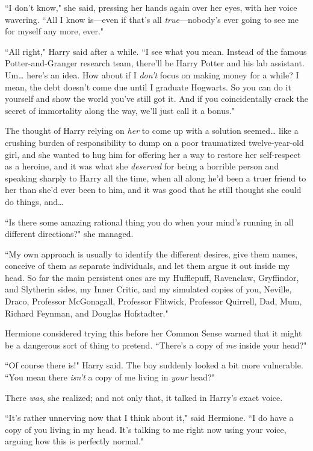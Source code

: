 ``I don't know," she said, pressing her hands again over her eyes, with her voice wavering. ``All I know is—even if that's all \emph{true}—nobody's ever going to see me for myself any more, ever."

``All right," Harry said after a while. ``I see what you mean. Instead of the famous Potter-and-Granger research team, there'll be Harry Potter and his lab assistant. Um{\ldots} here's an idea. How about if I \emph{don't} focus on making money for a while? I mean, the debt doesn't come due until I graduate Hogwarts. So you can do it yourself and show the world you've still got it. And if you coincidentally crack the secret of immortality along the way, we'll just call it a bonus."

The thought of Harry relying on \emph{her} to come up with a solution seemed{\ldots} like a crushing burden of responsibility to dump on a poor traumatized twelve-year-old girl, and she wanted to hug him for offering her a way to restore her self-respect as a heroine, and it was what she \emph{deserved} for being a horrible person and speaking sharply to Harry all the time, when all along he'd been a truer friend to her than she'd ever been to him, and it was good that he still thought she could do things, and{\ldots}

``Is there some amazing rational thing you do when your mind's running in all different directions?" she managed.

``My own approach is usually to identify the different desires, give them names, conceive of them as separate individuals, and let them argue it out inside my head. So far the main persistent ones are my Hufflepuff, Ravenclaw, Gryffindor, and Slytherin sides, my Inner Critic, and my simulated copies of you, Neville, Draco, Professor McGonagall, Professor Flitwick, Professor Quirrell, Dad, Mum, Richard Feynman, and Douglas Hofstadter."

Hermione considered trying this before her Common Sense warned that it might be a dangerous sort of thing to pretend. ``There's a copy of \emph{me} inside your head?"

``Of course there is!" Harry said. The boy suddenly looked a bit more vulnerable. ``You mean there \emph{isn't} a copy of me living in \emph{your} head?"

There \emph{was}, she realized; and not only that, it talked in Harry's exact voice.

``It's rather unnerving now that I think about it," said Hermione. ``I do have a copy of you living in my head. It's talking to me right now using your voice, arguing how this is perfectly normal."

